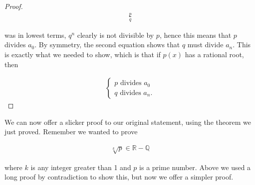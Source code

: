 \begin{proof}
	\begin{align*}
		\frac{p}{q}
	\end{align*}
	
	was in lowest terms, $q^n$ clearly is not divisible by $p$, hence this means that $p$ divides $a_0$. By symmetry, the second equation shows that $q$ must divide $a_n$. This is exactly what we needed to show, which is that if $p(x)$ has a rational root, then
	
	\begin{align*}
		\begin{cases}
			p \text{ divides } a_0 \\
			q \text{ divides } a_n.
		\end{cases}
	\end{align*}
\end{proof}
\vspace{\baselineskip}

We can now offer a slicker proof to our original statement, using the theorem we just proved. Remember we wanted to prove

\begin{align*}
	\sqrt[k]{p} \in \mathbb{R} - \mathbb{Q}
\end{align*}

where $k$ is any integer greater than 1 and $p$ is a prime number. Above we used a long proof by contradiction to show this, but now we offer a simpler proof.

